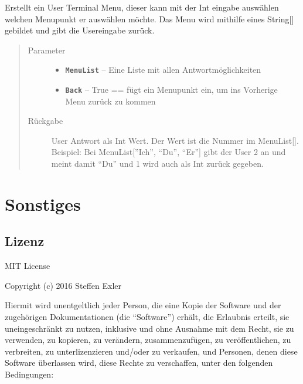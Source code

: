 \documentclass[letterpaper,10pt,ngerman]{sphinxmanual}
\begin{document}
\begin{fulllineitems}
\label{com/linuxluigi/polynomial/TerminalInterface:com.linuxluigi.polynomial.TerminalInterface.ShowMenu(String__, boolean)}
Erstellt ein User Terminal Menu, dieser kann mit der Int eingabe auswählen welchen Menupunkt er auswählen möchte. Das Menu wird mithilfe eines String{[}{]} gebildet und gibt die Usereingabe zurück.
\begin{quote}\begin{description}
\item[{Parameter}] \leavevmode\begin{itemize}
\item {} 
\textbf{\texttt{MenuList}} -- Eine Liste mit allen Antwortmöglichkeiten

\item {} 
\textbf{\texttt{Back}} -- True == fügt ein Menupunkt ein, um ins Vorherige Menu zurück zu kommen

\end{itemize}

\item[{Rückgabe}] \leavevmode
User Antwort als Int Wert. Der Wert ist die Nummer im MenuList{[}{]}. Beispiel: Bei MenuList{[}''Ich'', ``Du'', ``Er''{]} gibt der User 2 an und meint damit ``Du'' und 1 wird auch als Int zurück gegeben.

\end{description}\end{quote}

\end{fulllineitems}



\chapter{Sonstiges}
\label{index:sonstiges}

\section{Lizenz}
\label{license::doc}\label{license:lizenz}
MIT License

Copyright (c) 2016 Steffen Exler

Hiermit wird unentgeltlich jeder Person, die eine Kopie der Software und der zugehörigen Dokumentationen (die ``Software'') erhält, die Erlaubnis erteilt, sie uneingeschränkt zu nutzen, inklusive und ohne Ausnahme mit dem Recht, sie zu verwenden, zu kopieren, zu verändern, zusammenzufügen, zu veröffentlichen, zu verbreiten, zu unterlizenzieren und/oder zu verkaufen, und Personen, denen diese Software überlassen wird, diese Rechte zu verschaffen, unter den folgenden Bedingungen:
\end{document}
